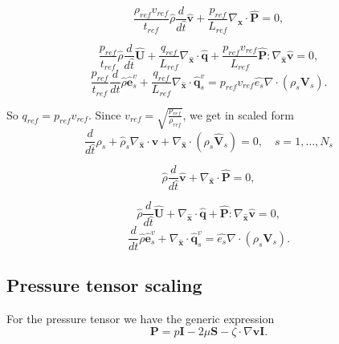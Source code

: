 \documentclass[a4paper,11pt,english]{article}
\begin{document}
\begin{equation}
     \frac{\rho_{ref}v_{ref}}{t_{ref}} \hat{\rho} \frac{d}{d\hat{t}}\hat{\mathbf{v}} + \frac{p_{ref}}{L_{ref}}\nabla_{\hat{\mathbf{x}}} \cdot \hat{\mathbf{P}} = 0,
\end{equation}

\begin{equation}
     \frac{p_{ref}}{t_{ref}} \hat{\rho} \frac{d}{d\hat{t}}\hat{\mathbf{U}} + \frac{q_{ref}}{L_{ref}} \nabla_{\hat{\mathbf{x}}} \cdot \hat{\mathbf{q}} + \frac{p_{ref}v_{ref}}{L_{ref}} \hat{\mathbf{P}} : \nabla_{\hat{\mathbf{x}}} \hat{\mathbf{v}} = 0,
\end{equation}
\begin{equation}
     \frac{p_{ref}}{t_{ref}} \frac{d}{dt} \hat{\rho} \hat{\mathbf{e}}^v_s + \frac{q_{ref}}{L_{ref}} \nabla_{\hat{\mathbf{x}}} \cdot \hat{\mathbf{q}}^v_s = p_{ref}v_{ref}\hat{e_s} \nabla \cdot (\rho_s \mathbf{V}_s).
\end{equation}

So $q_{ref} = p_{ref}v_{ref}$. Since $v_{ref} = \sqrt{\frac{p_{ref}}{\rho_{ref}}}$, we get in scaled form
\begin{equation}
     \frac{d}{d\hat{t}}\hat{\rho}_s +  \hat{\rho}_s \nabla_{\hat{\mathbf{x}}} \cdot \hat{\mathbf{v}} + \nabla_{\hat{\mathbf{x}}} \cdot (\rho_s \hat{\mathbf{V}}_s) = 0,\quad s=1,\ldots,N_s
 \end{equation}
 
 \begin{equation}
     \hat{\rho} \frac{d}{d\hat{t}}\hat{\mathbf{v}} + \nabla_{\hat{\mathbf{x}}} \cdot \hat{\mathbf{P}} = 0,
 \end{equation}
 
 \begin{equation}
     \hat{\rho} \frac{d}{d\hat{t}}\hat{\mathbf{U}} + \nabla_{\hat{\mathbf{x}}} \cdot \hat{\mathbf{q}} +  \hat{\mathbf{P}} : \nabla_{\hat{\mathbf{x}}} \hat{\mathbf{v}} = 0,
 \end{equation}
 \begin{equation}
      \frac{d}{dt} \hat{\rho} \hat{\mathbf{e}}^v_s + \nabla_{\hat{\mathbf{x}}} \cdot \hat{\mathbf{q}}^v_s = \hat{e_s} \nabla \cdot (\rho_s \mathbf{V}_s).
 \end{equation}


\subsection{Pressure tensor scaling}
For the pressure tensor we have the generic expression
\begin{equation}
     \mathbf{P} = p \mathbf{I} - 2\mu \mathbf{S} - \zeta \cdot \nabla \mathbf{v} \mathbf{I}.
\end{equation}
\end{document}

